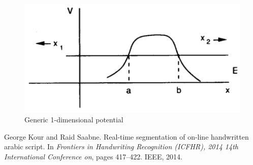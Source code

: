 \documentclass{article}
\begin{document}
\begin{figure}
    \centering
    \includegraphics{figures/genericPotential.png}
    \caption{Generic 1-dimensional potential}
    \label{fig:genericPotential}
\end{figure}

  
\begin{thebibliography}{1}
George Kour and Raid Saabne.
\newblock Real-time segmentation of on-line handwritten arabic script.
\newblock In {\em Frontiers in Handwriting Recognition (ICFHR), 2014 14th
  International Conference on}, pages 417--422. IEEE, 2014.

\end{thebibliography}
\end{document}
